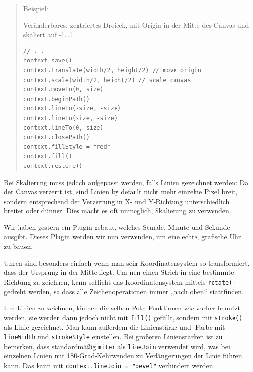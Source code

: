 \documentclass[a4paper]{article}
\begin{document}
\begin{quote}
\uline{Beispiel:}

Veränderbares, zentriertes Dreieck, mit Origin in der Mitte des Canvas und skaliert auf -1\ldots{}1
\begin{verbatim}
// ...
context.save()
context.translate(width/2, height/2) // move origin
context.scale(width/2, height/2) // scale canvas
context.moveTo(0, size)
context.beginPath()
context.lineTo(-size, -size)
context.lineTo(size, -size)
context.lineTo(0, size)
context.closePath()
context.fillStyle = "red"
context.fill()
context.restore()
\end{verbatim}
\end{quote}

Bei Skalierung muss jedoch aufgepasst werden, falls Linien gezeichnet werden: Da der Canvas verzerrt ist, sind Linien by default nicht mehr einzelne Pixel breit, sondern entsprechend der Verzerrung in X- und Y-Richtung unterschiedlich breiter oder dünner. Dies macht es oft unmöglich, Skalierung zu verwenden.

Wir haben gestern ein Plugin gebaut, welches Stunde, Minute und Sekunde ausgibt. Dieses Plugin werden wir nun verwenden, um eine echte, grafische Uhr zu bauen.

Uhren sind besonders einfach wenn man sein Koordinatensystem so transformiert, dass der Ursprung in der Mitte liegt. Um nun einen Strich in eine bestimmte Richtung zu zeichnen, kann schlicht das Koordinatensystem mittels \verb~rotate()~ gedreht werden, so dass alle Zeichenoperationen immer „nach oben“ stattfinden.

Um Linien zu zeichnen, können die selben Path-Funktionen wie vorher benutzt werden, sie werden dann jedoch nicht mit \verb~fill()~ gefüllt, sondern mit \verb~stroke()~ als Linie gezeichnet. Man kann außerdem die Linienstärke und -Farbe mit \verb~lineWidth~ und \verb~strokeStyle~ einstellen. Bei größeren Linienstärken ist zu bemerken, dass standardmäßig \verb~miter~ als \verb~lineJoin~ verwendet wird, was bei einzelnen Linien mit 180-Grad-Kehrwenden zu Verlängerungen der Linie führen kann. Das kann mit \verb~context.lineJoin = "bevel"~ verhindert werden.
\end{document}
